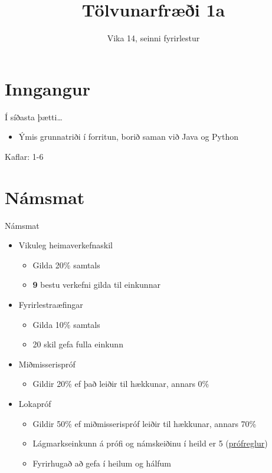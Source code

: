 \documentclass{beamer}
\title{Tölvunarfræði 1a}
\subtitle{Vika 14, seinni fyrirlestur}
\begin{document}
\begin{frame}
\titlepage
\end{frame}

\section{Inngangur}

\begin{frame}{Í síðasta þætti\ldots}
\begin{itemize}
 \item Ýmis grunnatriði í forritun, borið saman við Java og Python
\end{itemize}
Kaflar: 1-6
\end{frame}

\section{Námsmat}

\begin{frame}{Námsmat}
\begin{itemize}
 \item Vikuleg heimaverkefnaskil
 \begin{itemize}
  \item Gilda 20\% samtals
  \item \textbf{9} bestu verkefni gilda til einkunnar
 \end{itemize}
 \item Fyrirlestraæfingar
 \begin{itemize}
  \item Gilda 10\% samtals
  \item 20 skil gefa fulla einkunn
 \end{itemize}
 \item Miðmisserispróf
 \begin{itemize}
  \item Gildir 20\% ef það leiðir til hækkunar, annars 0\%
 \end{itemize}
 \item Lokapróf
 \begin{itemize}
  \item Gildir 50\% ef miðmisserispróf leiðir til hækkunar, annars 70\%
  \item Lágmarkseinkunn á prófi og námskeiðinu í heild er 5 (\href{https://ugla.hi.is/kennsluskra/?tab=skoli&chapter=content&id=34690}{prófreglur})
  \item Fyrirhugað að gefa í heilum og hálfum
 \end{itemize}
\end{itemize}
\end{frame}
\end{document}
